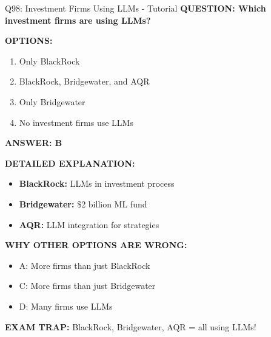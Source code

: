 \documentclass[8pt]{beamer}
\begin{document}
	\begin{frame}{Q98: Investment Firms Using LLMs - Tutorial}
		\fontsize{6.5}{7.5}\selectfont
		\textbf{QUESTION: Which investment firms are using LLMs?}
		
		\vspace{0.1cm}
		\textbf{OPTIONS:}
		\begin{enumerate}
			\item Only BlackRock
			\item BlackRock, Bridgewater, and AQR
			\item Only Bridgewater
			\item No investment firms use LLMs
		\end{enumerate}
		
		\vspace{0.1cm}
		\textcolor{myblue}{\textbf{ANSWER: B}}
		
		\vspace{0.1cm}
		\textbf{DETAILED EXPLANATION:}
		\begin{itemize}
			\item \textbf{BlackRock:} LLMs in investment process
			\item \textbf{Bridgewater:} \$2 billion ML fund
			\item \textbf{AQR:} LLM integration for strategies
		\end{itemize}
		
		\vspace{0.1cm}
		\textcolor{myred}{\textbf{WHY OTHER OPTIONS ARE WRONG:}}
		\begin{itemize}
			\item \textcolor{myred}{A:} More firms than just BlackRock
			\item \textcolor{myred}{C:} More firms than just Bridgewater
			\item \textcolor{myred}{D:} Many firms use LLMs
		\end{itemize}
		
		\textcolor{myred}{\textbf{EXAM TRAP:}} BlackRock, Bridgewater, AQR = \textcolor{myblue}{all using LLMs}!
	\end{frame}
	
\end{document}

